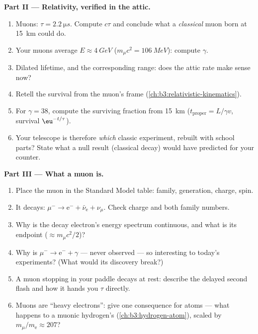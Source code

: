 \begin{problem}
\medskip\noindent\textbf{Part II --- Relativity, verified in the attic.}

\begin{enumerate}[resume]
  \item Muons: $\tau = \qty{2.2}{\micro s}$. Compute $c\tau$ and
        conclude what a \emph{classical} muon born at
        \qty{15}{km} could do.
  \item Your muons average $E \approx \qty{4}{GeV}$
        ($m_\mu c^2 = \qty{106}{MeV}$): compute $\gamma$.
  \item Dilated lifetime, and the corresponding range: does the
        attic rate make sense now?
  \item Retell the survival from the muon's frame
        (\cref{ch:b3:relativistic-kinematics}).
  \item For $\gamma = 38$, compute the surviving fraction from
        \qty{15}{km} ($t_{\text{proper}} = L/\gamma v$, survival
        $\eu^{-t/\tau}$).
  \item Your telescope is therefore \emph{which} classic
        experiment, rebuilt with school parts? State what a null
        result (classical decay) would have predicted for your
        counter.
\end{enumerate}

\medskip\noindent\textbf{Part III --- What a muon is.}

\begin{enumerate}[resume]
  \item Place the muon in the Standard Model table: family,
        generation, charge, spin.
  \item It decays: $\mu^- \to \text{e}^- + \bar\nu_{\text{e}} +
        \nu_\mu$. Check charge and both  family numbers.
  \item Why is the decay electron's energy spectrum continuous,
        and what is its endpoint ($\approx m_\mu c^2/2$)?
  \item Why is $\mu^- \to \text{e}^- + \gamma$ --- never
        observed --- so interesting to today's experiments?
        (What would its discovery break?)
  \item A muon stopping in your paddle decays at rest: describe
        the delayed second flash and how it hands you $\tau$
        directly.
  \item Muons are ``heavy electrons'': give one consequence for
        atoms --- what happens to a muonic hydrogen's  (\cref{ch:b3:hydrogen-atom}), scaled by
        $m_\mu/m_{\text{e}} \approx 207$?
\end{enumerate}


\end{problem}
